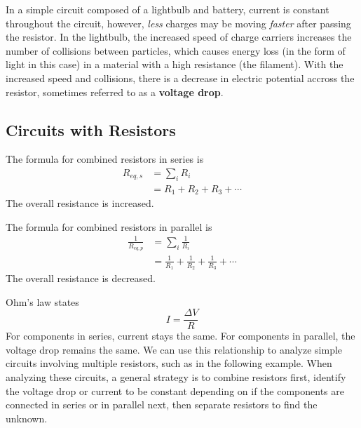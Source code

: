 \documentclass[12pt, titlepage]{article}
\begin{document}
 In a simple circuit composed of a lightbulb and battery, current is constant throughout the circuit, however, \textit{less} charges may be moving \textit{faster} after passing the resistor. In the lightbulb, the increased speed of charge carriers increases the number of collisions between particles, which causes energy loss (in the form of light in this case) in a material with a high resistance (the filament). With the increased speed and collisions, there is a decrease in electric potential accross the resistor, sometimes referred to as a \textbf{voltage drop}.
 \subsection*{Circuits with Resistors}
 The formula for combined resistors in series is
 \begin{align*}
    R_{eq,s} &= \sum_{i}R_{i} \\
    &= R_1+R_2+R_3+ \cdots
 \end{align*}
 The overall resistance is increased.

 The formula for combined resistors in parallel is
 \begin{align*}
    \frac{1}{R_{eq,p}} &= \sum_{i}\frac{1}{R_{i}} \\
    &= \frac{1}{R_1}+\frac{1}{R_2}+\frac{1}{R_3}+ \cdots
 \end{align*}
 The overall resistance is decreased.

 Ohm's law states
 \begin{equation*}
    I = \frac{\Delta V}{R}
 \end{equation*}
 For components in series, current stays the same. For components in parallel, the voltage drop remains the same. We can use this relationship to analyze simple circuits involving multiple resistors, such as in the following example. When analyzing these circuits, a general strategy is to combine resistors first, identify the voltage drop or current to be constant depending on if the components are connected in series or in parallel next, then separate resistors to find the unknown.
\end{document}
